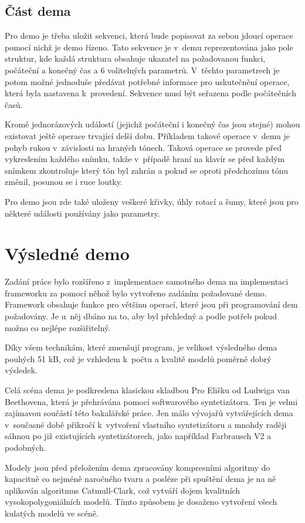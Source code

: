 \section{Část dema}
Pro demo je třeba uložit sekvenci, která bude popisovat za sebou jdoucí operace pomocí nichž je demo řízeno.
Tato sekvence je v~demu reprezentována jako pole struktur, kde každá struktura obsahuje ukazatel na požadovanou funkci, počáteční a konečný čas a 6 volitelných parametrů.
V~těchto parametrech je potom možné jednoduše předávat potřebné informace pro uskutečnění operace, která byla nastavena k~provedení.
Sekvence musí být seřazena podle počátečních časů.

Kromě jednorázových událostí (jejichž počáteční i konečný čas jsou stejné) mohou existovat ještě operace trvající delší dobu.
Příkladem takové operace v~demu je pohyb rukou v~závislosti na hraných tónech.
Taková operace se provede před vykreslením každého snímku, takže v~případě hraní na klavír se před každým snímkem zkontroluje který tón byl zahrán a pokud se oproti předchozímu tónu změnil, posunou se i ruce loutky.

Pro demo jsou zde také uloženy veškeré křivky, úhly rotací a šumy, které jsou pro některé události používány jako parametry.


\chapter{Výsledné demo}
Zadání práce bylo rozšířeno z~implementace samotného dema na implementaci frameworku za pomocí něhož bylo vytvořeno zadáním požadované demo.
Framework obsahuje funkce pro většinu operací, které jsou při programování dem požadovány. 
Je u~něj dbáno na to, aby byl přehledný a podle potřeb pokud možno co nejlépe rozšiřitelný.

Díky všem technikám, které zmenšují program, je velikost výsledného dema pouhých 51 kB, což je vzhledem k~počtu a kvalitě modelů poměrně dobrý výsledek. 


Celá scéna dema je podkreslena klasickou skladbou Pro Elišku od Ludwiga van Beethovena, která je přehrávána pomocí softwarového syntetizátoru.
Ten je velmi zajímavou součástí této bakalářské práce.
Jen málo vývojařů vytvářejících dema v~současné době přikročí k~vytvoření vlastního syntetizátoru a mnohdy raději sáhnou po již existujících syntetizátorech, jako například Farbrausch V2 a podobných.

Modely jsou před přeložením dema zpracovány kompresními algoritmy do kapacitně co nejméně naročného tvaru a posléze při spuštění dema je na ně aplikován algoritmus Catmull-Clark, což vytváří dojem kvalitních vysokopolygoniálních modelů.
Tímto způsobem je dosaženo vytvoření všech kulatých modelů ve scéně.

